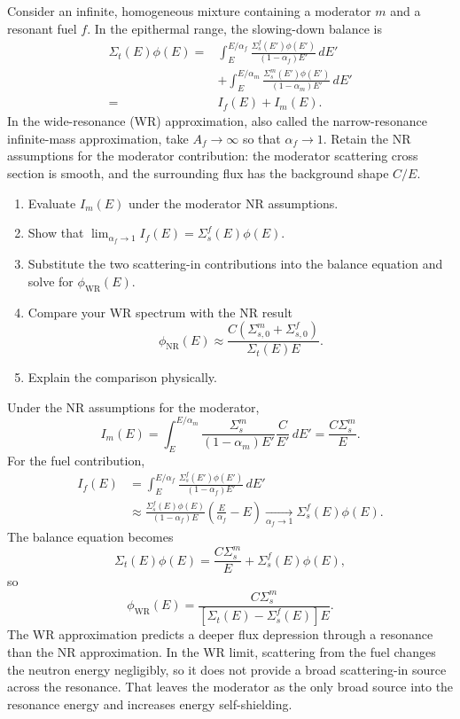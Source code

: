 Consider an infinite, homogeneous mixture containing a moderator $m$ and a
resonant fuel $f$. In the epithermal range, the slowing-down balance is
\[
\begin{aligned}
\Sigma_t(E)\phi(E)={}&
\int_E^{E/\alpha_f}
\frac{\Sigma_s^f(E')\phi(E')}{(1-\alpha_f)E'}\,dE'\\
&+\int_E^{E/\alpha_m}
\frac{\Sigma_s^m(E')\phi(E')}{(1-\alpha_m)E'}\,dE'\\
={}&I_f(E)+I_m(E).
\end{aligned}
\]
In the wide-resonance (WR) approximation, also called the narrow-resonance
infinite-mass approximation, take $A_f\to\infty$ so that $\alpha_f\to1$.
Retain the NR assumptions for the moderator contribution: the moderator
scattering cross section is smooth, and the surrounding flux has the
background shape $C/E$.
\begin{enumerate}[label=(\alph*)]
\item Evaluate $I_m(E)$ under the moderator NR assumptions.
\item Show that $\lim_{\alpha_f\to1}I_f(E)=\Sigma_s^f(E)\phi(E)$.
\item Substitute the two scattering-in contributions into the balance equation
      and solve for $\phi_{\mathrm{WR}}(E)$.
\item Compare your WR spectrum with the NR result
\[
 \phi_{\mathrm{NR}}(E)\approx
 \frac{C(\Sigma_{s,0}^m+\Sigma_{s,0}^f)}{\Sigma_t(E)E}.
\]
\item Explain the comparison physically.
\end{enumerate}

\begin{adaptedsolution}
Under the NR assumptions for the moderator,
\[
 I_m(E)
 =\int_E^{E/\alpha_m}
   \frac{\Sigma_s^m}{(1-\alpha_m)E'}\frac{C}{E'}\,dE'
 =\frac{C\Sigma_s^m}{E}.
\]
For the fuel contribution,
\begin{align*}
 I_f(E)
 &=\int_E^{E/\alpha_f}
   \frac{\Sigma_s^f(E')\phi(E')}{(1-\alpha_f)E'}\,dE'\\
 &\approx
   \frac{\Sigma_s^f(E)\phi(E)}{(1-\alpha_f)E}
   \left(\frac{E}{\alpha_f}-E\right)
 \xrightarrow[\alpha_f\to1]{}
 \Sigma_s^f(E)\phi(E).
\end{align*}
The balance equation becomes
\[
 \Sigma_t(E)\phi(E)=\frac{C\Sigma_s^m}{E}
 +\Sigma_s^f(E)\phi(E),
\]
so
\[
 \boxed{\phi_{\mathrm{WR}}(E)
 =\frac{C\Sigma_s^m}
        {[\Sigma_t(E)-\Sigma_s^f(E)]E}}.
\]
The WR approximation predicts a deeper flux depression through a resonance
than the NR approximation.  In the WR limit, scattering from the fuel changes
the neutron energy negligibly, so it does not provide a broad scattering-in
source across the resonance.  That leaves the moderator as the only broad
source into the resonance energy and increases energy self-shielding.
\end{adaptedsolution}

\clearpage
